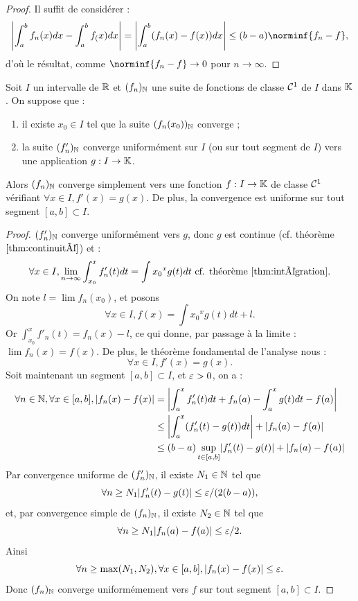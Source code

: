 \documentclass{article}
\begin{document}
\begin{proof}
Il suffit de considérer :
\[ \abs*{\int_a^b f_n(x) dx - \int_a^b f_(x) dx} = \abs*{\int_a^b (f_n(x)-f(x)) dx} \leq (b-a) \norminf{f_n-f} , \]
d'où le résultat, comme $\norminf{f_n-f} \to 0$ pour $n \to \infty$.
\end{proof}

\begin{thm}[Dérivation]
Soit $I$ un intervalle de $\mathbb{R}$ et $(f_n)_{\mathbb{N}}$ une suite de fonctions de classe $\mathcal{C}^1$ de $I$ dans $\mathbb{K}$.
On suppose que :
\begin{enumerate}[label=(\roman*)]
\item il existe $x_0 \in I$ tel que la suite $(f_n(x_0))_{\mathbb{N}}$ converge ;
\item la suite $(f'_n)_{\mathbb{N}}$ converge uniformément sur $I$ (ou sur tout segment de $I$) vers une application $g:I \to \mathbb{K}$.
\end{enumerate}
Alors $(f_n)_{\mathbb{N}}$ converge simplement vers une fonction $f:I \to \mathbb{K}$ de classe $\mathcal{C}^1$ vérifiant $\forall x \in I, f'(x)=g(x)$.
De plus, la convergence est uniforme sur tout segment $[a,b] \subset I$.
\end{thm}

\begin{proof}
$(f'_n)_{\mathbb{N}}$ converge uniformément vers $g$, donc $g$ est continue (cf. théorème $\ref{thm:continuité}$) et :
\[ \forall x \in I, \lim_{n \to \infty} \int_{x_0}^x f'_n(t) dt = \int{x_0}^x g(t)dt \text{ cf. théorème } \ref{thm:intégration} . \] 
On note $l = \lim f_n(x_0)$, et posons 
\[ \forall x \in I, f(x) = \int{x_0}^x g(t)dt + l. \]
Or $\int_{x_0}^x f'_n(t) = f_n(x) - l$, ce qui donne, par passage à la limite : $\lim f_n(x) = f(x)$.
De plus, le théorème fondamental de l'analyse nous : 
\[ \forall x \in I, f'(x) = g(x) . \] 
Soit maintenant un segment $[a,b] \subset I$, et $\varepsilon > 0$, on a :
\begin{align*} \forall n \in \N, \forall x \in [a,b], \abs{f_n(x) - f(x)} & = \abs*{\int_a^x f'_n(t)dt + f_n(a) - \int_a^x g(t)dt - f(a)} \\
& \leq \abs*{\int_a^x (f'_n(t) - g(t))dt} + \abs{f_n(a)-f(a)} \\
& \leq (b-a) \sup_{t \in [a,b]} \abs*{f'_n(t)-g(t)} + \abs{f_n(a)-f(a)} 
\end{align*}
Par convergence uniforme de $(f'_n)_{\mathbb{N}}$, il existe $N_1 \in \mathbb{N}$ tel que 
\[ \forall n \geq N_1 \abs*{f'_n(t)-g(t)} \leq \veps/(2(b-a)) , \]
et, par convergence simple de $(f_n)_{\mathbb{N}}$, il existe $N_2 \in \mathbb{N}$ tel que 
\[ \forall n \geq N_1 \abs*{f_n(a)-f(a)} \leq \veps/2. \]
Ainsi 
\[ \forall n \geq \max(N_1, N_2), \forall x \in [a,b], \lvert f_n(x) - f(x)\rvert  \leq \varepsilon . \]
Donc $(f_n)_{\mathbb{N}}$ converge uniformémement vers $f$ sur tout segment $[a,b]  \subset I$.
\end{proof}
\end{document}
